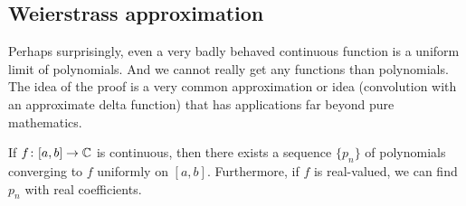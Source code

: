 \subsection{Weierstrass approximation}

Perhaps surprisingly, even a very badly behaved continuous function is
a uniform limit of polynomials.
And we cannot really get any 
functions than polynomials.
The idea of the proof is a very common approximation or  idea
(convolution with an approximate delta function) that has applications
far beyond pure mathematics.

\begin{thm}
If $f \colon [a,b] \to {\mathbb{C}}$ is continuous, then there exists a sequence $\{
p_n \}$ of polynomials converging to $f$ uniformly on $[a,b]$.
Furthermore, if $f$ is real-valued, we can find $p_n$ with real coefficients.
\end{thm}

